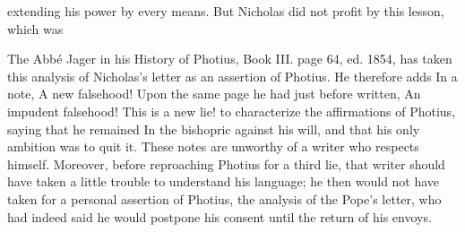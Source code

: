 extending his power by every means. But Nicholas did not profit by this lesson, which was

The Abbé Jager in his History of Photius, Book III. page 64, ed. 1854, has taken this analysis of Nicholas's letter as an assertion of Photius. He therefore adds In a note, A new falsehood! Upon the same page he had just before written, An impudent falsehood! This is a new lie! to characterize the affirmations of Photius, saying that he remained In the bishopric against his will, and that his only ambition was to quit it. These notes are unworthy of a writer who respects himself. Moreover, before reproaching Photius for a third lie, that writer should have taken a little trouble to understand his language; he then would not have taken for a personal assertion of Photius, the analysis of the Pope's letter, who had indeed said he would postpone his consent until the return of his envoys.

